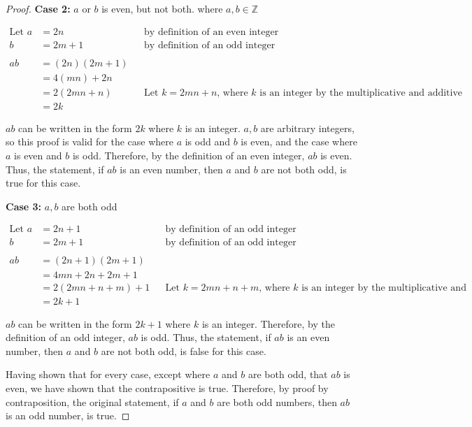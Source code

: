 \documentclass{article}
\begin{document}
\begin{enumerate}
\begin{proof}
        \textbf{Case 2:} $a$ or $b$ is even, but not both. where $a,b \in \mathbb{Z}$

        \begin{align*}
            \text{Let } a &= 2n &&\text{by definition of an even integer} \\
             b &= 2m + 1 &&\text{by definition of an odd integer} \\
             \\
             ab &= (2n)(2m+1) \\
             &= 4(mn)+2n \\
             &= 2(2mn + n) &&\text{Let $k = 2mn+n$, where $k$ is an integer by the multiplicative and additive properties of integers} \\
             &=2k
        \end{align*}

        $ab$ can be written in the form $2k$ where $k$ is an integer. $a,b$ are arbitrary integers, so this proof is valid for the case where $a$ is odd and $b$ is even, and the case where $a$ is even and $b$ is odd. Therefore, by the definition of an even integer, $ab$ is even. Thus, the statement, if $ab$ is an even number, then $a$ and $b$ are not both odd, is true for this case.
        \vspace{0.5cm}

        \textbf{Case 3:} $a,b$ are both odd

        \begin{align*}
            \text{Let } a &= 2n + 1 &&\text{by definition of an odd integer} \\
             b &= 2m + 1 &&\text{by definition of an odd integer} \\
             \\
             ab &= (2n + 1)(2m+1) \\
             &= 4mn + 2n + 2m + 1 \\
             &= 2(2mn + n + m) + 1 &&\text{Let $k = 2mn+n+m$, where $k$ is an integer by the multiplicative and additive properties of integers} \\
             &=2k + 1
        \end{align*}
        
        $ab$ can be written in the form $2k + 1$ where $k$ is an integer. Therefore, by the definition of an odd integer, $ab$ is odd. Thus, the statement, if $ab$ is an even number, then $a$ and $b$ are not both odd, is false for this case.

        Having shown that for every case, except where $a$ and $b$ are both odd, that $ab$ is even, we have shown that the contrapositive is true. Therefore, by proof by contraposition, the original statement, if $a$ and $b$ are both odd numbers, then $ab$ is an odd number, is true.

    \end{proof}
    
\end{enumerate}
\end{document}
